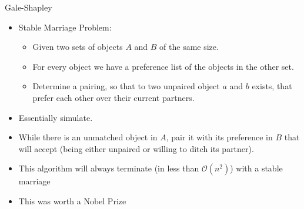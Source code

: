 \documentclass[12pt,t]{beamer}
\newcommand{\bi}{\begin{itemize}}
\newcommand{\ei}{\end{itemize}}
\begin{document}
\begin{frame}[fragile]{Gale-Shapley}
    \vspace{30pt}
    \bi
        \item Stable Marriage Problem:
        \bi
        	\item Given two sets of objects $A$ and $B$ of the same size.
        	\item For every object we have a preference list of the objects in the other set.
        	\item Determine a pairing, so that to two unpaired object $a$ and $b$ exists, that prefer each other over their current partners.
        \ei
       	\vspace{10pt}
       	\item<2-> Essentially simulate.
       	\item<2-> While there is an unmatched object in $A$, pair it with its preference in $B$ that will accept (being either unpaired or willing to ditch its partner).
       	\item<2-> This algorithm will always terminate (in less than $\mathcal O(n^2)$) with a stable marriage
       	\vspace{10pt}
       	\item<3-> This was worth a Nobel Prize 
    \ei
\end{frame}
\end{document}
